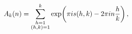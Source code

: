 \[A_{k}(n)=\sum_{\begin{subarray}{c}h=1\\
\left(h,k\right)=1\end{subarray}}^{k}\mathop{\exp\/}\nolimits\!\left(\pi is(h,%
k)-2\pi in\frac{h}{k}\right),\]